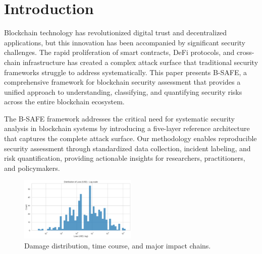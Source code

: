 \section{Introduction}
Blockchain technology has revolutionized digital trust and decentralized applications, but this innovation has been accompanied by significant security challenges. The rapid proliferation of smart contracts, DeFi protocols, and cross-chain infrastructure has created a complex attack surface that traditional security frameworks struggle to address systematically. This paper presents B-SAFE, a comprehensive framework for blockchain security assessment that provides a unified approach to understanding, classifying, and quantifying security risks across the entire blockchain ecosystem.

The B-SAFE framework addresses the critical need for systematic security analysis in blockchain systems by introducing a five-layer reference architecture that captures the complete attack surface. Our methodology enables reproducible security assessment through standardized data collection, incident labeling, and risk quantification, providing actionable insights for researchers, practitioners, and policymakers.

\begin{figure}[H]
\centering
\includegraphics[width=0.5\textwidth]{../figure/Figure/figures_2/A1_hist_loss_log.png}
\caption{Damage distribution, time course, and major impact chains.}
\label{fig:five_layer_architecture}
\end{figure}